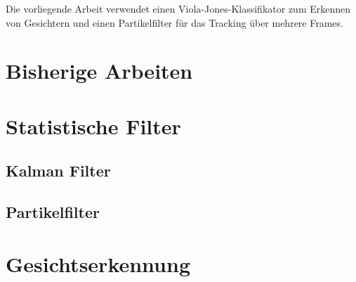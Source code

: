 \documentclass[a4paper, 11pt, twocolumn]{article}
\begin{document}
Die vorliegende Arbeit verwendet einen Viola-Jones-Klassifikator zum Erkennen von Gesichtern und einen Partikelfilter für das Tracking über mehrere Frames.


\section{Bisherige Arbeiten} %
\label{sec:bisherige_arbeiten}


\section{Statistische Filter} %
\label{sec:statistische_filter}


\subsection{Kalman Filter} %
\label{sub:kalman_filter}


\subsection{Partikelfilter} %
\label{sub:partikelfilter}


\section{Gesichtserkennung} %
\label{sec:gesichtserkennung}

%
\end{document}
